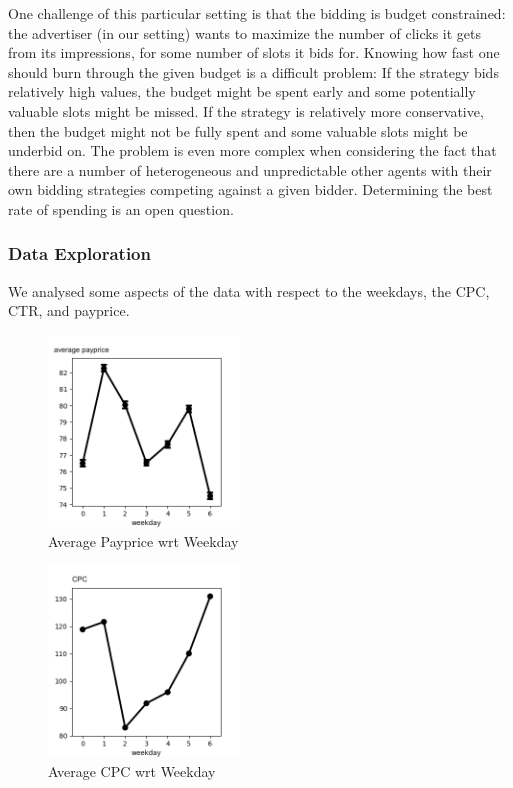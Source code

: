 \documentclass{sig-alternate-05-2015}
\begin{document}

One challenge of this particular setting is that the bidding is budget constrained: 
the advertiser (in our setting) wants to maximize the number of clicks it gets from its impressions, for some number of slots it bids for.
Knowing how fast one should burn through the given budget is a difficult problem\cite{BID1}:
If the strategy bids relatively high values, the budget might be spent early and some potentially valuable slots might be missed.
If the strategy is relatively more conservative, then the budget might not be fully spent and some valuable slots might be underbid on.
The problem is even more complex when considering the fact that there are a number of heterogeneous and unpredictable other agents with their own bidding strategies competing against a given bidder. \cite{BID1}
Determining the best rate of spending is an open question. \cite{OPENQ}



\subsubsection{Data Exploration}

We analysed some aspects of the data with respect to the weekdays, the CPC, CTR, and payprice.

\begin{figure}
\centering
\includegraphics[height=2in, width=2in]{images/weekday_AC.png}
\caption{Average Payprice wrt Weekday}
\end{figure}

\begin{figure}
\centering
\includegraphics[height=2in, width=2in]{images/weekday_CPC.png}
\caption{Average CPC wrt Weekday}
\end{figure}
\end{document}
